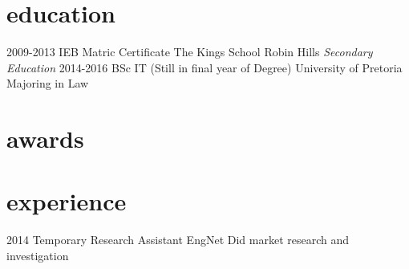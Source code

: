 \documentclass[]{twentysecondcv}
\begin{document}
\section{education}

\begin{twenty}
  \twentyitem
    {2009-2013}
    {IEB Matric Certificate}
    {The Kings School Robin Hills}
    {\emph{Secondary Education}}
  \twentyitem
    {2014-2016}
    {BSc IT (Still in final year of Degree)}
    {University of Pretoria}
    {Majoring in Law}
\end{twenty}


\section{awards}


\section{experience}

\begin{twenty}
  \twentyitem
    {2014}
    {Temporary Research Assistant}
    {EngNet}
    {Did market research and investigation}
\end{twenty}

\end{document}
